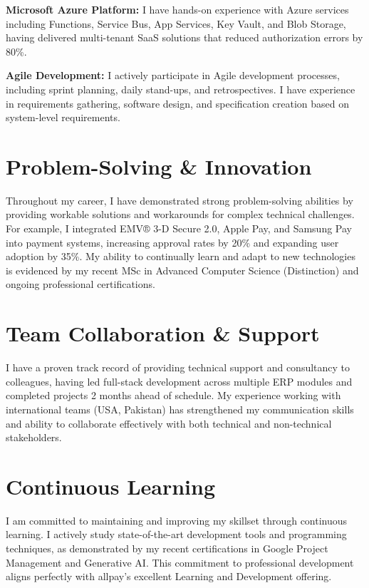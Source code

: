 \documentclass[letterpaper,10pt]{article}
\begin{document}
\textbf{Microsoft Azure Platform:} I have hands-on experience with Azure services including Functions, Service Bus, App Services, Key Vault, and Blob Storage, having delivered multi-tenant SaaS solutions that reduced authorization errors by 80\%.

\textbf{Agile Development:} I actively participate in Agile development processes, including sprint planning, daily stand-ups, and retrospectives. I have experience in requirements gathering, software design, and specification creation based on system-level requirements.

\section{Problem-Solving \& Innovation}

Throughout my career, I have demonstrated strong problem-solving abilities by providing workable solutions and workarounds for complex technical challenges. For example, I integrated EMV® 3-D Secure 2.0, Apple Pay, and Samsung Pay into payment systems, increasing approval rates by 20\% and expanding user adoption by 35\%. My ability to continually learn and adapt to new technologies is evidenced by my recent MSc in Advanced Computer Science (Distinction) and ongoing professional certifications.

\section{Team Collaboration \& Support}

I have a proven track record of providing technical support and consultancy to colleagues, having led full-stack development across multiple ERP modules and completed projects 2 months ahead of schedule. My experience working with international teams (USA, Pakistan) has strengthened my communication skills and ability to collaborate effectively with both technical and non-technical stakeholders.

\section{Continuous Learning}

I am committed to maintaining and improving my skillset through continuous learning. I actively study state-of-the-art development tools and programming techniques, as demonstrated by my recent certifications in Google Project Management and Generative AI. This commitment to professional development aligns perfectly with allpay's excellent Learning and Development offering.
\end{document}
